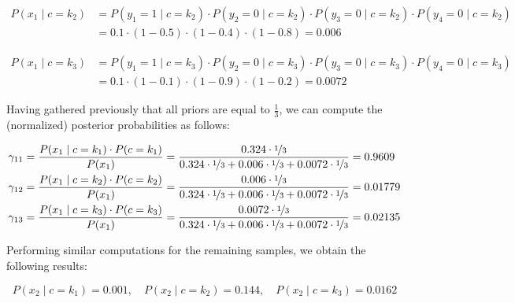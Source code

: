 \documentclass[12pt]{article}
\begin{document}
\begin{enumerate}[leftmargin=\labelsep]
  \begin{equation*}
    \begin{aligned}
      P(x_1 \mid c = k_2) & = P(y_1 = 1 \mid c = k_2) \cdot P(y_2 = 0 \mid c = k_2) \cdot P(y_3 = 0 \mid c = k_2) \cdot P(y_4 = 0 \mid c = k_2) \\
                          & = 0.1 \cdot (1 - 0.5) \cdot (1 - 0.4) \cdot (1 - 0.8) = 0.006
    \end{aligned}
  \end{equation*}

  \begin{equation*}
    \begin{aligned}
      P(x_1 \mid c = k_3) & = P(y_1 = 1 \mid c = k_3) \cdot P(y_2 = 0 \mid c = k_3) \cdot P(y_3 = 0 \mid c = k_3) \cdot P(y_4 = 0 \mid c = k_3) \\
                          & = 0.1 \cdot (1 - 0.1) \cdot (1 - 0.9) \cdot (1 - 0.2) = 0.0072
    \end{aligned}
  \end{equation*}

  Having gathered previously that all priors are equal to $\frac{1}{3}$, we can
  compute the (normalized) posterior probabilities as follows:

  \begin{equation*}
    \begin{aligned}
      \gamma_{11} & = \frac{P(x_1 \mid c = k_1) \cdot P(c = k_1)}{P(x_1)} = \frac{0.324 \cdot \nicefrac{1}{3}}{0.324 \cdot \nicefrac{1}{3} + 0.006 \cdot \nicefrac{1}{3} + 0.0072 \cdot \nicefrac{1}{3}} = 0.9609   \\
      \gamma_{12} & = \frac{P(x_1 \mid c = k_2) \cdot P(c = k_2)}{P(x_1)} = \frac{0.006 \cdot \nicefrac{1}{3}}{0.324 \cdot \nicefrac{1}{3} + 0.006 \cdot \nicefrac{1}{3} + 0.0072 \cdot \nicefrac{1}{3}} = 0.01779  \\
      \gamma_{13} & = \frac{P(x_1 \mid c = k_3) \cdot P(c = k_3)}{P(x_1)} = \frac{0.0072 \cdot \nicefrac{1}{3}}{0.324 \cdot \nicefrac{1}{3} + 0.006 \cdot \nicefrac{1}{3} + 0.0072 \cdot \nicefrac{1}{3}} = 0.02135
    \end{aligned}
  \end{equation*}

  Performing similar computations for the remaining samples, we obtain the following results:

  \begin{equation*}
    P(x_2 \mid c = k_1) = 0.001, \quad P(x_2 \mid c = k_2) = 0.144, \quad P(x_2 \mid c = k_3) = 0.0162
  \end{equation*}


\end{enumerate}
\end{document}
